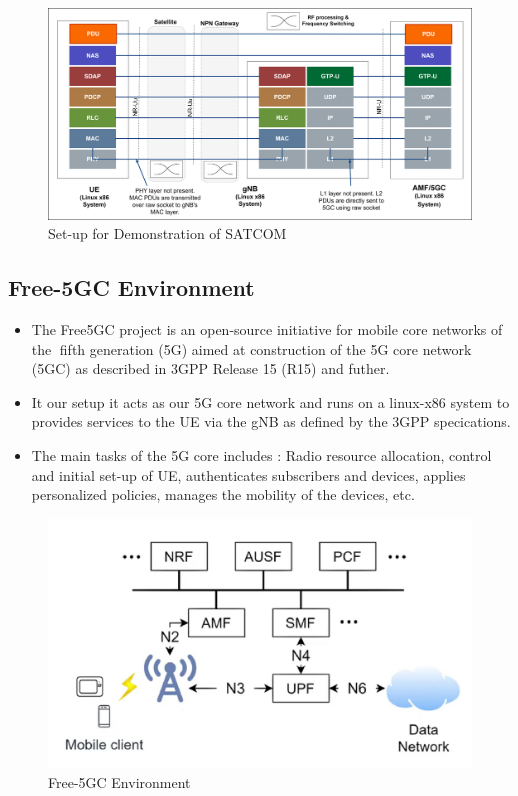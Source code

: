 \begin{figure}[h!]
\centering
\includegraphics[width=1.05\columnwidth]{./Figures/SATCOM_setup1.png}
\caption{Set-up for Demonstration of SATCOM}
\label{SATCOM_setup}
\end{figure}



\subsection{Free-5GC Environment}
\begin{itemize}
	\item The Free5GC project is an open-source initiative for mobile core networks of the fifth generation (5G) aimed at construction of the 5G core network (5GC) as described in 3GPP Release 15 (R15) and futher.
	\item It our setup it acts as our 5G core network and runs on a linux-x86 system to provides services to the UE via the gNB as defined by the 3GPP specications.
	\item The main tasks of the 5G core includes : Radio resource allocation, control and initial set-up of UE, authenticates subscribers and devices, applies personalized policies, manages the mobility of the devices, etc.
\end{itemize}
\begin{figure}[h!]
\centering
\includegraphics[width=0.8\columnwidth]{./Figures/Free5GC.png}
\caption{Free-5GC Environment}
\label{Free5GC}
\end{figure}

